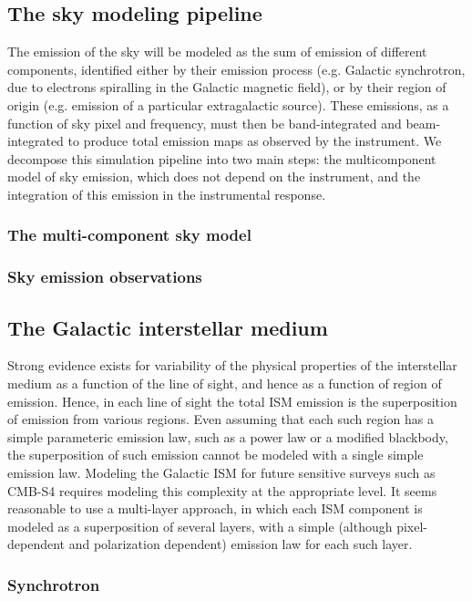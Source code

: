 \subsection{The sky modeling pipeline}

The emission of the sky will be modeled as the sum of emission of different components, identified either by their emission process (e.g. Galactic synchrotron, due to electrons spiralling in the Galactic magnetic field), or by their region of origin (e.g. emission of a particular extragalactic source). These emissions, as a function of sky pixel and frequency, must then be band-integrated and beam-integrated to produce total emission maps as observed by the instrument. We decompose this simulation pipeline into two main steps: the multicomponent model of sky emission, which does not depend on the instrument, and the integration of this emission in the instrumental response.

\subsubsection{The multi-component sky model}

\subsubsection{Sky emission observations}

\subsection{The Galactic interstellar medium}

Strong evidence exists for variability of the physical properties of the interstellar medium as a function of the line of sight, and hence as a function of region of emission. Hence, in each line of sight  the total ISM emission is the superposition of emission from various regions. Even assuming that each such region has a simple parameteric emission law, such as a power law or a modified blackbody, the superposition of such emission cannot be modeled with a single simple emission law. Modeling the Galactic ISM for future sensitive surveys such as CMB-S4 requires  modeling  this complexity at the appropriate level. It seems reasonable to use a multi-layer approach, in which each ISM component is modeled as a superposition of several layers, with a simple (although pixel-dependent and polarization dependent) emission law for each such layer.

\subsubsection{Synchrotron}

